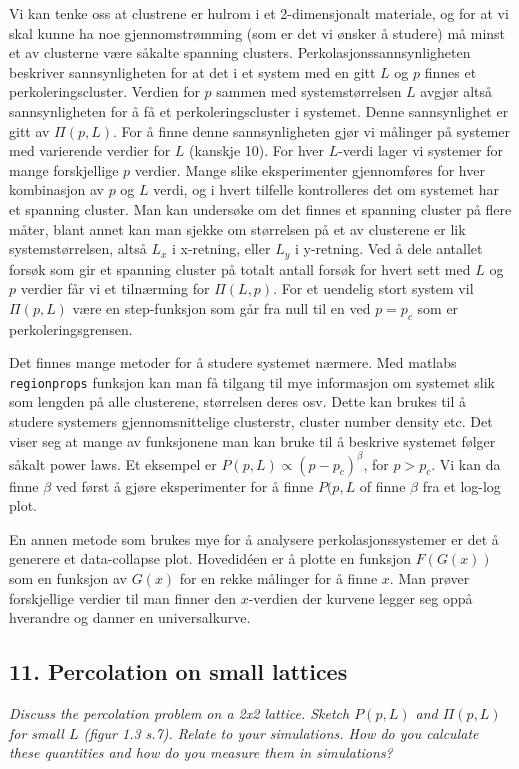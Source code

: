 \documentclass[a4paper,10pt]{article}
\begin{document}
Vi kan tenke oss at clustrene er hulrom i et 2-dimensjonalt materiale, og for at vi skal kunne ha noe gjennomstrømming (som er det vi ønsker å studere) må minst et av clusterne være såkalte spanning clusters. Perkolasjonssannsynligheten beskriver sannsynligheten for at det i et system med en gitt $L$ og $p$ finnes et perkoleringscluster. Verdien for $p$ sammen med systemstørrelsen $L$ avgjør altså sannsynligheten for å få et perkoleringscluster i systemet. Denne sannsynlighet er gitt av $\Pi(p,L)$. For å finne denne sannsynligheten gjør vi målinger på systemer med varierende verdier for $L$ (kanskje 10). For hver $L$-verdi lager vi systemer for mange forskjellige $p$ verdier. Mange slike eksperimenter gjennomføres for hver kombinasjon av $p$ og $L$ verdi, og i hvert tilfelle kontrolleres det om systemet har et spanning cluster. Man kan undersøke om det finnes et spanning cluster på flere måter, blant annet kan man sjekke om størrelsen på et av clusterene er lik systemstørrelsen, altså $L_x$ i x-retning, eller $L_y$ i y-retning. Ved å dele antallet forsøk som gir et spanning cluster på totalt antall forsøk for hvert sett med $L$ og $p$ verdier får vi et tilnærming for $\Pi(L,p)$. For et uendelig stort system vil $\Pi(p,L)$ være en step-funksjon som går fra null til en ved $p=p_c$ som er perkoleringsgrensen.

Det finnes mange metoder for å studere systemet nærmere. Med matlabs \verb;regionprops; funksjon kan man få tilgang til mye informasjon om systemet slik som lengden på alle clusterene, størrelsen deres osv. Dette kan brukes til å studere systemers gjennomsnittelige clusterstr, cluster number density etc. Det viser seg at mange av funksjonene man kan bruke til å beskrive systemet følger såkalt power laws. Et eksempel er $P(p,L)\propto (p-p_c)^{\beta}$, for $p>p_c$. Vi kan da finne $\beta$ ved først å gjøre eksperimenter for å finne $P(p,L$ of finne $\beta$ fra et log-log plot. 

En annen metode som brukes mye for å analysere perkolasjonssystemer er det  å generere et data-collapse plot. Hovedidéen er å plotte en funksjon $F(G(x))$ som en funksjon av $G(x)$ for en rekke målinger for å finne $x$. Man prøver forskjellige verdier til man finner den $x$-verdien der kurvene legger seg oppå hverandre og danner en universalkurve.


\subsection*{11. Percolation on small lattices}
\textit{Discuss the percolation problem on a 2x2 lattice. Sketch $P(p, L)$ and $\Pi(p, L)$
for small $L$ (figur 1.3 s.7). Relate to your simulations. How do you calculate these quantities and
how do you measure them in simulations?}
\end{document}
